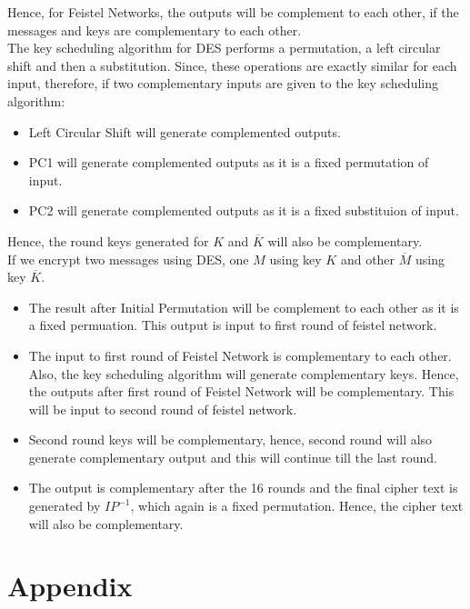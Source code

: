 \documentclass[11pt]{article}
\begin{document}
Hence, for Feistel Networks, the outputs will be complement to each other, if the messages and keys are complementary to each other.\\
\newline
The key scheduling algorithm for DES performs a permutation, a left circular shift and then a substitution. Since, these operations are exactly similar for each input, therefore, if two complementary inputs are given to the key scheduling algorithm:
\begin{itemize}
    \item Left Circular Shift will generate complemented outputs.
    \item PC1 will generate complemented outputs as it is a fixed permutation of input.
    \item PC2 will generate complemented outputs as it is a fixed substituion of input.
\end{itemize}
Hence, the round keys generated for $K$ and $\overline{K}$ will also be complementary.\\
\newline
If we encrypt two messages using DES, one $M$ using key $K$ and other $\overline{M}$ using key $\overline{K}$.
\begin{itemize}
    \item The result after Initial Permutation will be complement to each other as it is a fixed permuation. This output is input to first round of feistel network.
    \item The input to first round of Feistel Network is complementary to each other. Also, the key scheduling algorithm will generate complementary keys. Hence, the outputs after first round of Feistel Network will be complementary. This will be input to second round of feistel network.
    \item Second round keys will be complementary, hence, second round will also generate complementary output and this will continue till the last round.
    \item The output is complementary after the 16 rounds and the final cipher text is generated by $IP^{-1}$, which again is a fixed permutation. Hence, the cipher text will also be complementary.
    
\end{itemize}
\section{Appendix}
\label{appendix}
\end{document}
